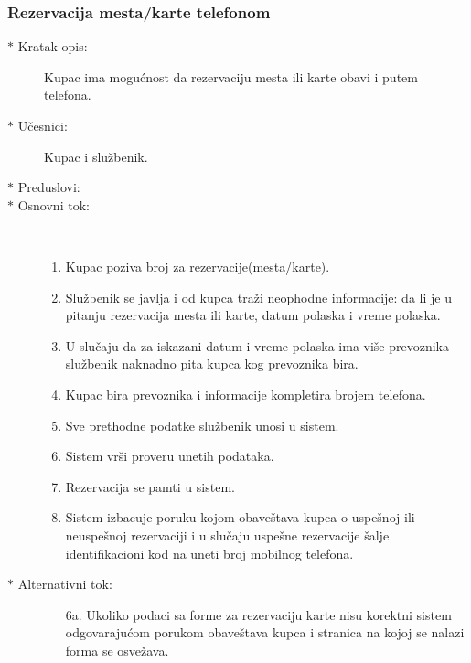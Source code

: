 \subsubsection{Rezervacija mesta/karte telefonom}
\begin{description}
	\item [$\ast$ Kratak opis: ] Kupac ima mogu\' cnost da rezervaciju mesta ili karte obavi i putem telefona.
	\item[$\ast$ U\v cesnici: ] Kupac i slu\v zbenik.
	\item[$\ast$ Preduslovi: ]
	\item[$\ast$ Osnovni tok: ] \ \\
	\renewcommand{\labelenumii}{\Roman{enumii}}
	\begin{enumerate}
		\item Kupac poziva broj za rezervacije(mesta/karte).
		\item Slu\v zbenik se javlja i od kupca tra\v zi neophodne informacije: da li je u pitanju rezervacija mesta ili karte, datum polaska i vreme polaska.
		\item U slu\v caju da za iskazani datum i vreme polaska ima vi\v se prevoznika slu\v zbenik naknadno pita kupca kog prevoznika bira.
		\item Kupac bira prevoznika i informacije kompletira brojem telefona.
		\item Sve prethodne podatke slu\v zbenik unosi u sistem.
		\item Sistem vr\v si proveru unetih podataka.
		\item Rezervacija se pamti u sistem.
		\item Sistem izbacuje poruku kojom obave\v stava kupca o uspe\v snoj ili neuspe\v snoj rezervaciji i u slu\v caju uspe\v sne rezervacije \v salje identifikacioni kod na uneti broj mobilnog telefona.		
	\end{enumerate}
	\item[$\ast$ Alternativni tok: ]
	\begin{enumerate}
		\item[6a. ] Ukoliko podaci sa forme za rezervaciju karte nisu korektni sistem odgovaraju\' com porukom obave\v stava kupca i stranica na kojoj se nalazi forma se osve\v zava.
	\end{enumerate}
	

\end{description}
